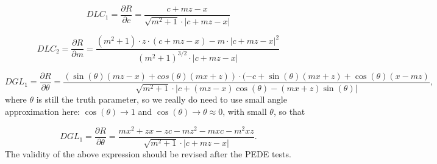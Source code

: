 \documentclass[a4paper,11pt]{article}
\begin{document}
\begin{equation}
DLC_1 = \frac{\partial R}{\partial c} = \frac{ c+mz-x }  { \sqrt{m^2+1} \cdot |c+mz-x| }
\end{equation}

\begin{equation}
DLC_2 = \frac{ \partial R}{\partial m} = \frac{ (m^2+1)\cdot z\cdot(c+mz-x) - m\cdot |c+mz-x|^2 }{ (m^2+1)^{3/2} \cdot |c+mz-x|  }
\end{equation}

\begin{equation}	
DGL_1 = \frac{\partial R}{\partial\theta} = \frac{(\sin(\theta)(mz-x)+cos(\theta)(mx+z)) \cdot (-c+\sin(\theta)(mx+z)+\cos(\theta)(x-mz)}{\sqrt{m^2+1} \cdot |c+(mz-x)\cos(\theta) - (mx+z)\sin(\theta)|},
\end{equation}
where $\theta$ is still the truth parameter, so we really do need to use small angle approximation here: $\cos(\theta) \rightarrow 1$ and $\cos(\theta) \rightarrow \theta \approx 0$, with small $\theta$, so that 

\begin{equation}	
DGL_1 = \frac{\partial R}{\partial\theta} = \frac{mx^2+zx-zc-mz^2-mxc-m^2xz}{\sqrt{m^2+1} \cdot |c+mz-x|}.
\end{equation}
The validity of the above expression should be revised after the PEDE tests. 
\clearpage



\nocite{*}
\thispagestyle{plain}
%
\end{document}
